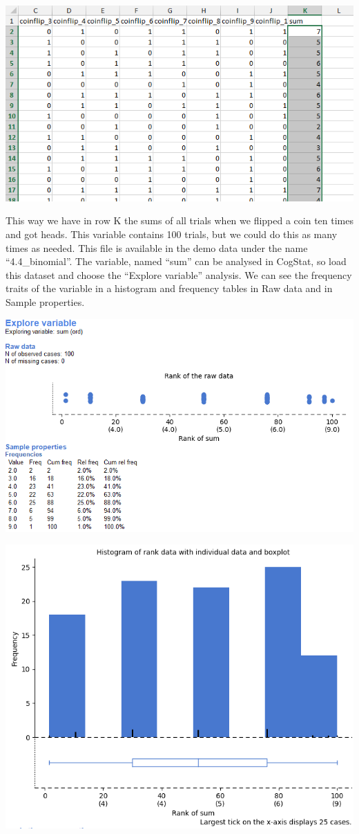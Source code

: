 \documentclass[
]{book}
\begin{document}
\includegraphics{img/ch4/4.4coinflipmoretrials.png}

This way we have in row K the sums of all trials when we flipped a coin ten times and got heads. This variable contains 100 trials, but we could do this as many times as needed. This file is available in the demo data under the name ``4.4\_binomial''. The variable, named ``sum'' can be analysed in CogStat, so load this dataset and choose the ``Explore variable'' analysis. We can see the frequency traits of the variable in a histogram and frequency tables in Raw data and in Sample properties.

\includegraphics{img/ch4/4.4expvarraw.png}

\includegraphics{img/ch4/4.4binomdistr.png}
\end{document}
